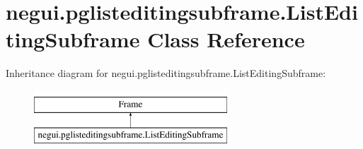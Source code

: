 \hypertarget{classnegui_1_1pglisteditingsubframe_1_1ListEditingSubframe}{}\section{negui.\+pglisteditingsubframe.\+List\+Editing\+Subframe Class Reference}
\label{classnegui_1_1pglisteditingsubframe_1_1ListEditingSubframe}
Inheritance diagram for negui.\+pglisteditingsubframe.\+List\+Editing\+Subframe\+:\begin{figure}[H]
\begin{center}
\leavevmode
\includegraphics[height=2.000000cm]{classnegui_1_1pglisteditingsubframe_1_1ListEditingSubframe}
\end{center}
\end{figure}

